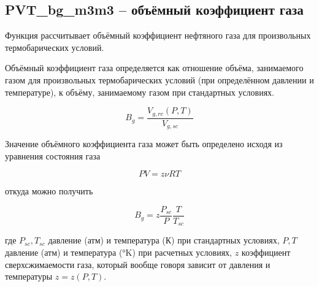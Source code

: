 \subsection{PVT\_bg\_m3m3 – объёмный коэффициент газа}
Функция рассчитывает объёмный коэффициент нефтяного газа для произвольных термобарических условий. 

Объёмный коэффициент газа определяется как отношение объёма, занимаемого газом для произвольных термобарических условий (при определённом давлении и температуре), к объёму, занимаемому газом при стандартных условиях. 

$$B_g = \frac{V_{g,rc}(P,T)}{V_{g,sc}}$$

Значение объёмного коэффициента газа может быть определено исходя из уравнения состояния газа

$$ PV = z \nu RT  $$

откуда можно получить 

$$ B_g = z \frac{P_{sc}}{P} \frac{T}{T_{sc}} $$

где $P_{sc}, T_{sc}$ давление (атм) и температура (К) при стандартных условиях, $P,T$ давление (атм) и температура (°K) при расчетных условиях, $z$ коэффициент сверхсжимаемости газа, который вообще говоря зависит от давления и температуры $z = z(P,T)$. 


\newcommand{\DataFile}{data/Bg_P_data.txt}

